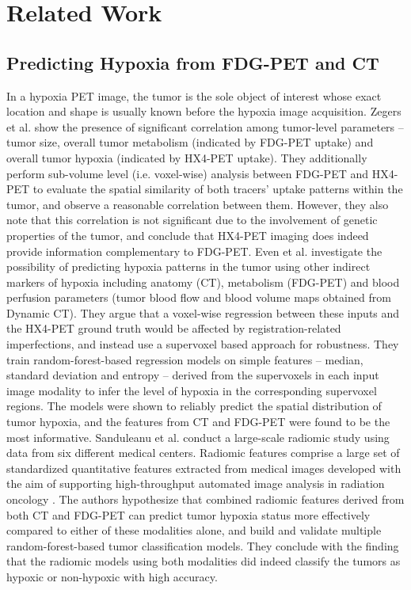\chapter{Related Work}
\label{Related_Work}



\section{Predicting Hypoxia from FDG-PET and CT}
\label{Related_Work-hypoxia_prediction}
In a hypoxia PET image, the tumor is the sole object of interest whose exact location and shape is usually known before the hypoxia image acquisition. Zegers et al. \cite{zegers2014vivo} show the presence of significant correlation among tumor-level parameters -- tumor size, overall tumor metabolism (indicated by FDG-PET uptake) and overall tumor hypoxia (indicated by HX4-PET uptake). They additionally perform sub-volume level (i.e. voxel-wise) analysis between FDG-PET and HX4-PET to evaluate the spatial similarity of both tracers' uptake patterns within the tumor, and observe a reasonable correlation between them. However, they also note that this correlation is not significant due to the involvement of genetic properties of the tumor, and conclude that HX4-PET imaging does indeed provide information complementary to FDG-PET. Even et al. \cite{even2017predicting} investigate the possibility of predicting hypoxia patterns in the tumor using other indirect markers of hypoxia including anatomy (CT), metabolism (FDG-PET) and blood perfusion parameters (tumor blood flow and blood volume maps obtained from Dynamic CT). They argue that a voxel-wise regression between these inputs and the HX4-PET ground truth would be affected by registration-related imperfections, and instead use a supervoxel based approach for robustness. They train random-forest-based regression models on simple features -- median, standard deviation and entropy -- derived from the supervoxels in each input image modality to infer the level of hypoxia in the corresponding supervoxel regions. The models were shown to reliably predict the spatial distribution of tumor hypoxia, and the features from CT and FDG-PET were found to be the most informative. Sanduleanu et al. \cite{sanduleanu2020non} conduct a large-scale radiomic study using data from six different medical centers. Radiomic features comprise a large set of standardized quantitative features extracted from medical images developed with the aim of supporting high-throughput automated image analysis in radiation oncology \cite{aerts2014decoding}. The authors hypothesize that combined radiomic features derived from both CT and FDG-PET can predict tumor hypoxia status more effectively compared to either of these modalities alone, and build and validate multiple random-forest-based tumor classification models. They conclude with the finding that the radiomic models using both modalities did indeed classify the tumors as hypoxic or non-hypoxic with high accuracy.

